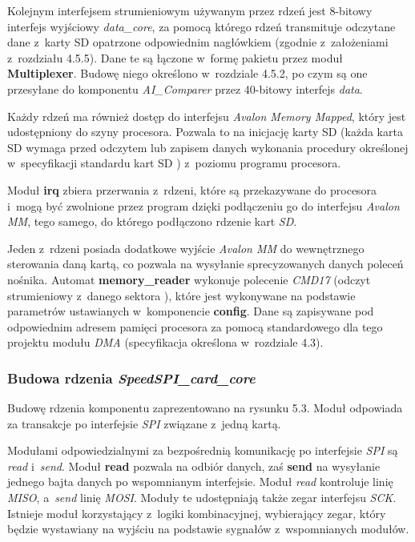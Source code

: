Kolejnym interfejsem strumieniowym używanym przez rdzeń jest 8-bitowy interfejs wyjściowy \textit{data\_core}, za pomocą którego rdzeń transmituje odczytane dane z~karty SD opatrzone odpowiednim nagłówkiem (zgodnie z~założeniami z~rozdziału 4.5.5). Dane te są łączone w~formę pakietu przez moduł \textbf{Multiplexer}. Budowę niego określono w~rozdziale 4.5.2, po czym są one przesyłane do komponentu \textit{AI\_Comparer} przez 40-bitowy interfejs \textit{data}.

Każdy rdzeń ma również dostęp do interfejsu \textit{Avalon Memory Mapped}, który jest udostępniony do szyny procesora. Pozwala to na inicjację karty SD (każda karta SD wymaga przed odczytem lub zapisem danych wykonania procedury określonej w~specyfikacji standardu kart SD \cite{SDA}) z~poziomu programu procesora.

Moduł \textbf{irq} zbiera przerwania z~rdzeni, które są przekazywane do procesora i~mogą być zwolnione przez program dzięki podłączeniu go do interfejsu \textit{Avalon MM}, tego samego, do którego podłączono rdzenie kart \textit{SD}.

Jeden z~rdzeni posiada dodatkowe wyjście \textit{Avalon MM} do wewnętrznego sterowania daną kartą, co pozwala na wysyłanie sprecyzowanych danych poleceń nośnika. Automat \textbf{memory\_reader} wykonuje polecenie \textit{CMD17} (odczyt strumieniowy z~danego sektora \cite{SDA}), które jest wykonywane na podstawie parametrów ustawianych w~komponencie \textbf{config}. Dane są zapisywane pod odpowiednim adresem pamięci procesora za pomocą standardowego dla tego projektu modułu \textit{DMA} (specyfikacja określona w~rozdziale 4.3).

\subsubsection{Budowa rdzenia \textit{SpeedSPI\_card\_core}}
Budowę rdzenia komponentu zaprezentowano na rysunku 5.3. Moduł odpowiada za transakcje po interfejsie \textit{SPI} związane z~jedną kartą.

Modułami odpowiedzialnymi za bezpośrednią komunikację po interfejsie \textit{SPI} są \textit{read} i~\textit{send}. Moduł \textbf{read} pozwala na odbiór danych, zaś \textbf{send} na wysyłanie jednego bajta danych po wspomnianym interfejsie. Moduł \textit{read} kontroluje linię \textit{MISO}, a~\textit{send} linię \textit{MOSI}. Moduły te udostępniają także zegar interfejsu \textit{SCK}. Istnieje moduł korzystający z~logiki kombinacyjnej, wybierający zegar, który będzie wystawiany na wyjściu na podstawie sygnałów z~wspomnianych modułów.

